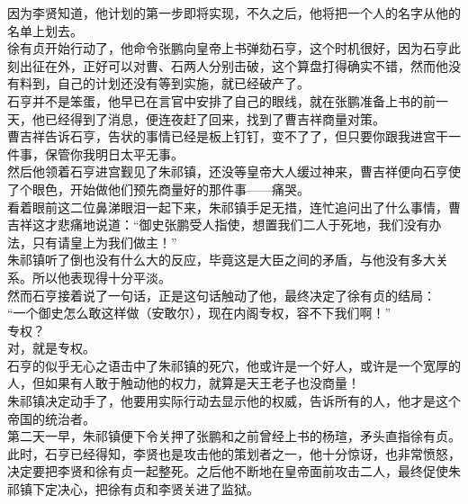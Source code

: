 \begin{multicols}{\theparacolNo}
因为李贤知道，他计划的第一步即将实现，不久之后，他将把一个人的名字从他的名单上划去。\\

徐有贞开始行动了，他命令张鹏向皇帝上书弹劾石亨，这个时机很好，因为石亨此刻出征在外，正好可以对曹、石两人分别击破，这个算盘打得确实不错，然而他没有料到，自己的计划还没有等到实施，就已经破产了。\\

石亨并不是笨蛋，他早已在言官中安排了自己的眼线，就在张鹏准备上书的前一天，他已经得到了消息，便连夜赶了回来，找到了曹吉祥商量对策。\\

曹吉祥告诉石亨，告状的事情已经是板上钉钉，变不了了，但只要你跟我进宫干一件事，保管你我明日太平无事。\\

然后他领着石亨进宫觐见了朱祁镇，还没等皇帝大人缓过神来，曹吉祥便向石亨使了个眼色，开始做他们预先商量好的那件事——痛哭。\\

看着眼前这二位鼻涕眼泪一起下来，朱祁镇手足无措，连忙追问出了什么事情，曹吉祥这才悲痛地说道：“御史张鹏受人指使，想置我们二人于死地，我们没有办法，只有请皇上为我们做主！”\\

朱祁镇听了倒也没有什么大的反应，毕竟这是大臣之间的矛盾，与他没有多大关系。所以他表现得十分平淡。\\

然而石亨接着说了一句话，正是这句话触动了他，最终决定了徐有贞的结局：\\

“一个御史怎么敢这样做（安敢尔），现在内阁专权，容不下我们啊！”\\

专权？\\

对，就是专权。\\

石亨的似乎无心之语击中了朱祁镇的死穴，他或许是一个好人，或许是一个宽厚的人，但如果有人敢于触动他的权力，就算是天王老子也没商量！\\

朱祁镇决定动手了，他要用实际行动去显示他的权威，告诉所有的人，他才是这个帝国的统治者。\\

第二天一早，朱祁镇便下令关押了张鹏和之前曾经上书的杨瑄，矛头直指徐有贞。\\

此时，石亨已经得知，李贤也是攻击他的策划者之一，他十分惊讶，也非常愤怒，决定要把李贤和徐有贞一起整死。之后他不断地在皇帝面前攻击二人，最终促使朱祁镇下定决心，把徐有贞和李贤关进了监狱。\\


\end{multicols}
